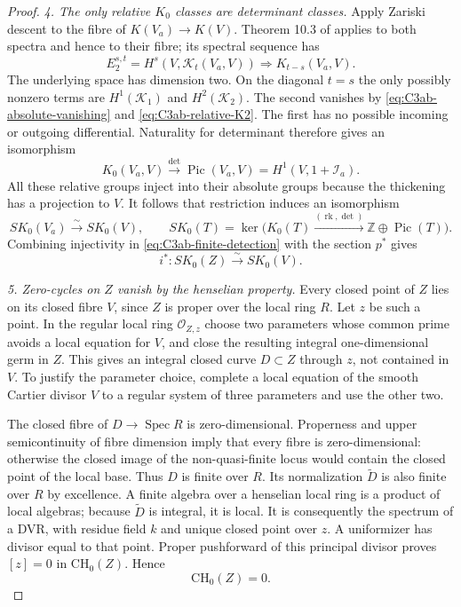 \begin{proof}
\emph{4. The only relative $K_0$ classes are determinant classes.}
Apply Zariski descent to the fibre of $K(V_a)\to K(V)$.
Theorem 10.3 of \citet[pp.~383--386]{D_ThomasonTrobaugh1990}
applies to both spectra and hence to their fibre; its spectral
sequence has
\[
 E_2^{s,t}=H^s(V,\mathcal K_t(V_a,V))
                       \Longrightarrow K_{t-s}(V_a,V).
\]
The underlying space has dimension two. On the diagonal
$t=s$ the only possibly nonzero terms are
$H^1(\mathcal K_1)$ and $H^2(\mathcal K_2)$.
The second vanishes by
\eqref{eq:C3ab-absolute-vanishing} and
\eqref{eq:C3ab-relative-K2}. The first has no possible incoming
or outgoing differential. Naturality for determinant therefore
gives an isomorphism
\[
 K_0(V_a,V)\xrightarrow{\det}\operatorname{Pic}(V_a,V)
         =H^1(V,1+\mathcal I_a).
\]
All these relative groups inject into their absolute groups
because the thickening has a projection to $V$.
It follows that restriction induces an isomorphism
\[
 SK_0(V_a)\xrightarrow{\sim}SK_0(V),\qquad
 SK_0(T)=\ker\bigl(K_0(T)\xrightarrow{(\operatorname{rk},\det)}
                         \mathbb Z\oplus\operatorname{Pic}(T)\bigr).
\]
Combining injectivity in \eqref{eq:C3ab-finite-detection}
with the section $p^*$ gives
\begin{equation}\label{eq:C3ab-SK0}
                 i^*:SK_0(Z)\xrightarrow{\sim}SK_0(V).
\end{equation}

\emph{5. Zero-cycles on $Z$ vanish by the henselian property.}
Every closed point of $Z$ lies on its closed fibre $V$, since
$Z$ is proper over the local ring $R$. Let $z$ be such a point.
In the regular local ring $\mathcal O_{Z,z}$ choose two parameters
whose common prime avoids a local equation for $V$, and close
the resulting integral one-dimensional germ in $Z$. This gives
an integral closed curve $D\subset Z$ through $z$, not contained
in $V$. To justify the parameter choice, complete a local
equation of the smooth Cartier divisor $V$ to a regular system
of three parameters and use the other two.

The closed fibre of $D\to\operatorname{Spec}R$ is
zero-dimensional. Properness and upper semicontinuity of fibre
dimension imply that every fibre is zero-dimensional: otherwise
the closed image of the non-quasi-finite locus would contain
the closed point of the local base. Thus $D$ is finite over
$R$. Its normalization $\widetilde D$ is also finite over $R$
by excellence. A finite algebra over a henselian local ring is
a product of local algebras; because $\widetilde D$ is integral,
it is local. It is consequently the spectrum of a DVR, with
residue field $k$ and unique closed point over $z$.
A uniformizer has divisor equal to that point. Proper
pushforward of this principal divisor proves $[z]=0$ in
$\mathrm{CH}_0(Z)$. Hence
\begin{equation}\label{eq:C3ab-CH0-resolution}
                          \mathrm{CH}_0(Z)=0.
\end{equation}


\end{proof}
